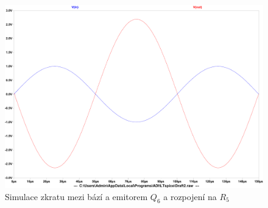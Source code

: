 \documentclass{article}
\newcommand \obr[1]
{ obr.~\ref{#1}}
\begin{document}
\begin{figure}[H]
  \centering
  \includegraphics[width=\textwidth]{sim/porucha-7/tran.pdf}
  \caption{Simulace zkratu mezi bází a emitorem \(Q_6\) a rozpojení na \(R_5\)}
  \label{tran-porucha6}
\end{figure}










\end{document}
